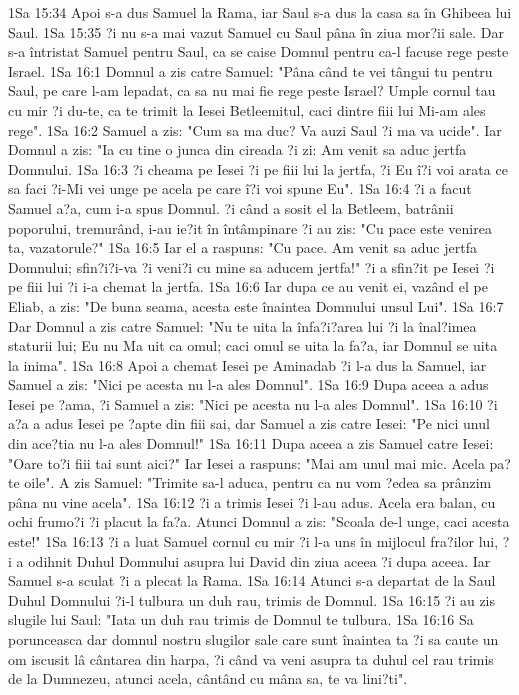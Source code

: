 1Sa 15:34  Apoi s-a dus Samuel la Rama, iar Saul s-a dus la casa sa în Ghibeea lui Saul.
1Sa 15:35  ?i nu s-a mai vazut Samuel cu Saul pâna în ziua mor?ii sale. Dar s-a întristat Samuel pentru Saul, ca se caise Domnul pentru ca-l facuse rege peste Israel.
1Sa 16:1  Domnul a zis catre Samuel: "Pâna când te vei tângui tu pentru Saul, pe care l-am lepadat, ca sa nu mai fie rege peste Israel? Umple cornul tau cu mir ?i du-te, ca te trimit la Iesei Betleemitul, caci dintre fiii lui Mi-am ales rege".
1Sa 16:2  Samuel a zis: "Cum sa ma duc? Va auzi Saul ?i ma va ucide". Iar Domnul a zis: "Ia cu tine o junca din cireada ?i zi: Am venit sa aduc jertfa Domnului.
1Sa 16:3  ?i cheama pe Iesei ?i pe fiii lui la jertfa, ?i Eu î?i voi arata ce sa faci ?i-Mi vei unge pe acela pe care î?i voi spune Eu".
1Sa 16:4  ?i a facut Samuel a?a, cum i-a spus Domnul. ?i când a sosit el la Betleem, batrânii poporului, tremurând, i-au ie?it în întâmpinare ?i au zis: "Cu pace este venirea ta, vazatorule?"
1Sa 16:5  Iar el a raspuns: "Cu pace. Am venit sa aduc jertfa Domnului; sfin?i?i-va ?i veni?i cu mine sa aducem jertfa!" ?i a sfin?it pe Iesei ?i pe fiii lui ?i i-a chemat la jertfa.
1Sa 16:6  Iar dupa ce au venit ei, vazând el pe Eliab, a zis: "De buna seama, acesta este înaintea Domnului unsul Lui".
1Sa 16:7  Dar Domnul a zis catre Samuel: "Nu te uita la înfa?i?area lui ?i la înal?imea staturii lui; Eu nu Ma uit ca omul; caci omul se uita la fa?a, iar Domnul se uita la inima".
1Sa 16:8  Apoi a chemat Iesei pe Aminadab ?i l-a dus la Samuel, iar Samuel a zis: "Nici pe acesta nu l-a ales Domnul".
1Sa 16:9  Dupa aceea a adus Iesei pe ?ama, ?i Samuel a zis: "Nici pe acesta nu l-a ales Domnul".
1Sa 16:10  ?i a?a a adus Iesei pe ?apte din fiii sai, dar Samuel a zis catre Iesei: "Pe nici unul din ace?tia nu l-a ales Domnul!"
1Sa 16:11  Dupa aceea a zis Samuel catre Iesei: "Oare to?i fiii tai sunt aici?" Iar Iesei a raspuns: "Mai am unul mai mic. Acela pa?te oile". A zis Samuel: "Trimite sa-l aduca, pentru ca nu vom ?edea sa prânzim pâna nu vine acela".
1Sa 16:12  ?i a trimis Iesei ?i l-au adus. Acela era balan, cu ochi frumo?i ?i placut la fa?a. Atunci Domnul a zis: "Scoala de-l unge, caci acesta este!"
1Sa 16:13  ?i a luat Samuel cornul cu mir ?i l-a uns în mijlocul fra?ilor lui, ?i a odihnit Duhul Domnului asupra lui David din ziua aceea ?i dupa aceea. Iar Samuel s-a sculat ?i a plecat la Rama.
1Sa 16:14  Atunci s-a departat de la Saul Duhul Domnului ?i-l tulbura un duh rau, trimis de Domnul.
1Sa 16:15  ?i au zis slugile lui Saul: "Iata un duh rau trimis de Domnul te tulbura.
1Sa 16:16  Sa porunceasca dar domnul nostru slugilor sale care sunt înaintea ta ?i sa caute un om iscusit lâ cântarea din harpa, ?i când va veni asupra ta duhul cel rau trimis de la Dumnezeu, atunci acela, cântând cu mâna sa, te va lini?ti".
